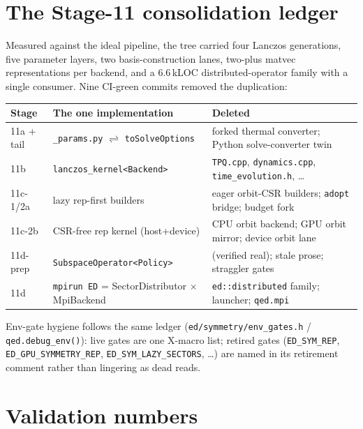 \documentclass[11pt]{article}
\newcommand{\file}[1]{\texttt{\small #1}}
\begin{document}
\section{The Stage-11 consolidation ledger}

Measured against the ideal pipeline, the tree carried four Lanczos
generations, five parameter layers, two basis-construction lanes, two-plus
matvec representations per backend, and a 6.6\,kLOC distributed-operator
family with a single consumer. Nine CI-green commits removed the
duplication:

\begin{center}\small
\begin{tabular}{@{}lll@{}}
\toprule
Stage & The one implementation & Deleted \\
\midrule
11a + tail & \file{\_params.py} $\rightleftharpoons$ \texttt{toSolveOptions} & forked thermal converter; Python solve-converter twin \\
11b & \texttt{lanczos\_kernel<Backend>} & \file{TPQ.cpp}, \file{dynamics.cpp}, \file{time\_evolution.h}, \dots \\
11c-1/2a & lazy rep-first builders & eager orbit-CSR builders; \texttt{adopt} bridge; budget fork \\
11c-2b & CSR-free rep kernel (host+device) & CPU orbit backend; GPU orbit mirror; device orbit lane \\
11d-prep & \texttt{SubspaceOperator<Policy>} & (verified real); stale prose; straggler gates \\
11d & \texttt{mpirun ED} = SectorDistributor $\times$ MpiBackend & \texttt{ed::distributed} family; launcher; \texttt{qed.mpi} \\
\bottomrule
\end{tabular}
\end{center}

Env-gate hygiene follows the same ledger
(\file{ed/symmetry/env\_gates.h} / \texttt{qed.debug\_env()}): live gates
are one X-macro list; retired gates (\texttt{ED\_SYM\_REP},
\texttt{ED\_GPU\_SYMMETRY\_REP}, \texttt{ED\_SYM\_LAZY\_SECTORS}, \dots)
are named in its retirement comment rather than lingering as dead reads.

\section{Validation numbers}
\end{document}
